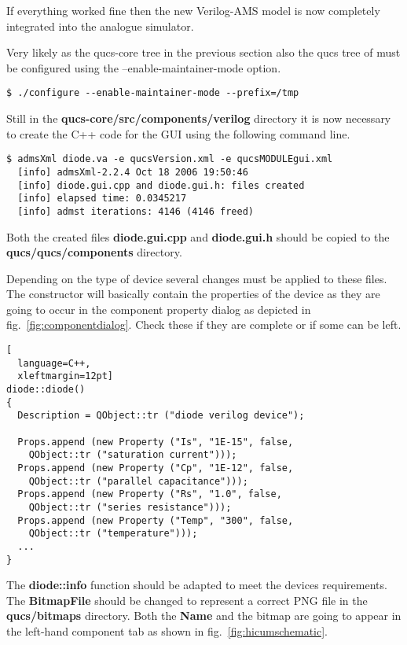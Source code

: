 \addvspace{12pt}

If everything worked fine then the new Verilog-AMS model is now
completely integrated into the analogue simulator.


Very likely as the qucs-core tree in the previous section also the
qucs tree of must be configured using the --enable-maintainer-mode
option.
\begin{Verbatim}[fontsize=\small]
  $ ./configure --enable-maintainer-mode --prefix=/tmp
\end{Verbatim}

Still in the \textbf{qucs-core/src/components/verilog} directory it is
now necessary to create the C++ code for the GUI using the following
command line.

\begin{Verbatim}[fontsize=\small]
  $ admsXml diode.va -e qucsVersion.xml -e qucsMODULEgui.xml
  [info] admsXml-2.2.4 Oct 18 2006 19:50:46
  [info] diode.gui.cpp and diode.gui.h: files created
  [info] elapsed time: 0.0345217
  [info] admst iterations: 4146 (4146 freed)
\end{Verbatim}

Both the created files \textbf{diode.gui.cpp} and \textbf{diode.gui.h}
should be copied to the \textbf{qucs/qucs/components} directory.

\addvspace{12pt}

Depending on the type of device several changes must be applied to
these files.  The constructor will basically contain the properties of
the device as they are going to occur in the component property dialog
as depicted in fig.~\ref{fig:componentdialog}.  Check these if they
are complete or if some can be left.
\begin{lstlisting}[
  language=C++,
  xleftmargin=12pt]
diode::diode()
{
  Description = QObject::tr ("diode verilog device");

  Props.append (new Property ("Is", "1E-15", false,
    QObject::tr ("saturation current")));
  Props.append (new Property ("Cp", "1E-12", false,
    QObject::tr ("parallel capacitance")));
  Props.append (new Property ("Rs", "1.0", false,
    QObject::tr ("series resistance")));
  Props.append (new Property ("Temp", "300", false,
    QObject::tr ("temperature")));
  ...
}
\end{lstlisting}

The \textbf{diode::info} function should be adapted to meet the
devices requirements.  The \textbf{BitmapFile} should be changed to
represent a correct PNG file in the \textbf{qucs/bitmaps} directory.
Both the \textbf{Name} and the bitmap are going to appear in the
left-hand component tab as shown in fig.~\ref{fig:hicumschematic}.


